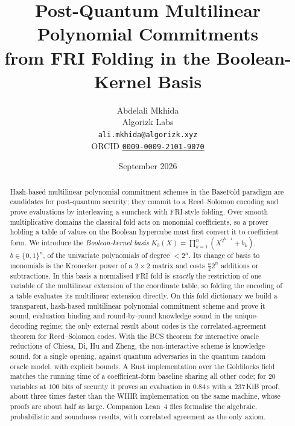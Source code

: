 \documentclass[11pt]{article}
\title{Post-Quantum Multilinear Polynomial Commitments\\ from FRI Folding in the Boolean-Kernel Basis}
\author{Abdelali Mkhida\\ Algorizk Labs\\ \texttt{ali.mkhida@algorizk.xyz}\\ ORCID \href{https://orcid.org/0009-0009-2101-9070}{\texttt{0009-0009-2101-9070}}}
\date{September 2026}
\theoremstyle{definition}
\begin{document}
\maketitle

\begin{abstract}
Hash-based multilinear polynomial commitment schemes in the BaseFold paradigm are candidates for post-quantum security; they commit to a Reed--Solomon encoding and prove evaluations by interleaving a sumcheck with FRI-style folding.
Over smooth multiplicative domains the classical fold acts on monomial coefficients, so a prover holding a table of values on the Boolean hypercube must first convert it to coefficient form.
We introduce the \emph{Boolean-kernel basis} $K_b(X) = \prod_{k=1}^{n}(X^{2^{k-1}} + b_k)$, $b \in \{0,1\}^n$, of the univariate polynomials of degree $< 2^n$.
Its change of basis to monomials is the Kronecker power of a $2\times 2$ matrix and costs $\tfrac{n}{2}2^n$ additions or subtractions.
In this basis a normalised FRI fold is \emph{exactly} the restriction of one variable of the multilinear extension of the coordinate table, so folding the encoding of a table evaluates its multilinear extension directly.
On this fold dictionary we build a transparent, hash-based multilinear polynomial commitment scheme and prove it sound, evaluation binding and round-by-round knowledge sound in the unique-decoding regime; the only external result about codes is the correlated-agreement theorem for Reed--Solomon codes.
With the BCS theorem for interactive oracle reductions of Chiesa, Di, Hu and Zheng, the non-interactive scheme is knowledge sound, for a single opening, against quantum adversaries in the quantum random oracle model, with explicit bounds.
A Rust implementation over the Goldilocks field matches the running time of a coefficient-form baseline sharing all other code; for $20$ variables at $100$ bits of security it proves an evaluation in $0.84$\,s with a $237$\,KiB proof, about three times faster than the WHIR implementation on the same machine, whose proofs are about half as large.
Companion Lean~4 files formalise the algebraic, probabilistic and soundness results, with correlated agreement as the only axiom.
\end{abstract}

\tableofcontents











\end{document}
